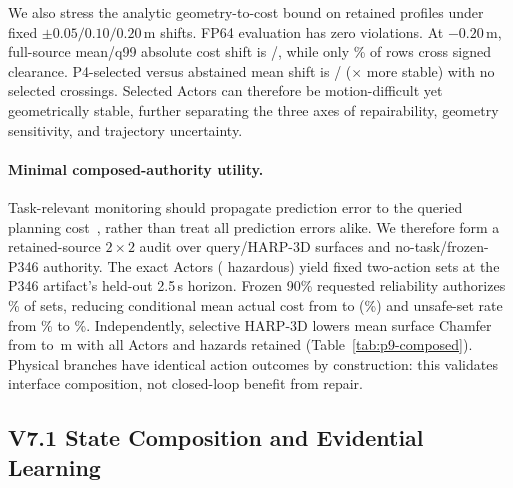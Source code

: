 We also stress the analytic geometry-to-cost bound on \PsevenBRows{} retained profiles under \PsevenBShifts{} fixed
$\pm0.05/0.10/0.20$\,m shifts. FP64 evaluation has zero violations. At $-0.20$\,m, full-source mean/q99 absolute cost shift is
\PsevenBMeanShift{}/\PsevenBQShift{}, while only \PsevenBSignCross{}\% of rows cross signed clearance. P4-selected versus
abstained mean shift is \PsevenBSelectedShift{}/\PsevenBAbstainedShift{} (\PsevenBStabilityRatio{}$\times$ more stable) with
no selected crossings. Selected Actors can therefore be motion-difficult yet geometrically stable, further separating the three
axes of repairability, geometry sensitivity, and trajectory uncertainty.



\paragraph{Minimal composed-authority utility.}
Task-relevant monitoring should propagate prediction error to the queried planning cost~\cite{farid2023task}, rather than
treat all prediction errors alike. We therefore form a retained-source $2\times2$ audit over query/HARP-3D surfaces and
no-task/frozen-P346 authority. The \PnineActors{} exact Actors (\PnineHazards{} hazardous) yield \PnineSets{} fixed two-action
sets at the P346 artifact's held-out 2.5\,s horizon. Frozen 90\% requested reliability authorizes
\PnineAuthorityCoverage{}\% of sets, reducing conditional mean actual cost from \PnineAllCost{} to
\PnineAuthorizedCost{} (\PnineCostReduction{}\%) and unsafe-set rate from \PnineAllUnsafe{}\% to
\PnineAuthorizedUnsafe{}\%. Independently, selective HARP-3D lowers mean surface Chamfer from \PnineQueryChamfer{} to
\PnineHarpChamfer{}\,m with all Actors and hazards retained (Table~\ref{tab:p9-composed}). Physical branches have identical
action outcomes by construction: this validates interface composition, not closed-loop benefit from repair.

\subsection{V7.1 State Composition and Evidential Learning}

